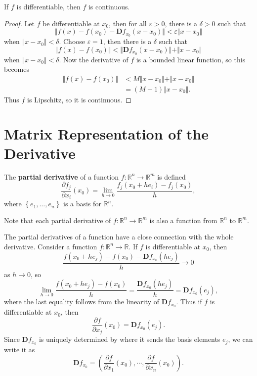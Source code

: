 \documentclass[10pt]{report}
\begin{document}
\begin{prop}
	If $f$ is differentiable, then $f$ is continuous.
\end{prop}
\begin{proof}
	Let $f$ be differentiable at $x_0$, then for all $\varepsilon > 0$, there is a $\delta > 0$ such that
	\[
		\Vert{f(x) - f(x_0) - \mathbf{D}f_{x_0}(x-x_0)}\Vert < \varepsilon \Vert{x-x_0}\Vert
	\] when $\Vert{x-x_0}\Vert< \delta$. Choose $\varepsilon = 1$, then there is a $\delta$ such that
	\[
		\Vert{f(x) - f(x_0)}\Vert < \Vert{\mathbf{D}f_{x_0}(x-x_0)}\Vert+ \Vert{x-x_0}\Vert
	\] when $\Vert{x-x_0}\Vert< \delta$. Now the derivative of $f$ is a bounded linear function, so this becomes
	\begin{align*}
		\Vert{f(x) - f(x_0)}\Vert &< M \Vert{x-x_0}\Vert+ \Vert{x-x_0}\Vert \\
					  &= (M+1) \Vert{x-x_0}\Vert.
	\end{align*}
	Thus $f$ is Lipschitz, so it is continuous.
\end{proof}



\section{Matrix Representation of the Derivative}

\begin{defn}[]
The \textbf{partial derivative} of a function $f:\mathbb{R}^n \to \mathbb{R}^m$ is defined
\[
	\frac{\partial f_j}{\partial x_i} (x_0) = \lim_{h \to 0} \frac{f_j(x_0 + h e_i) - f_j(x_0)}{h},
\] where $\left\{ e_1, \dots, e_n \right\}$ is a basis for $\mathbb{R}^n$.
\end{defn}

Note that each partial derivative of $f: \mathbb{R}^n \to \mathbb{R}^m$ is also a function from $\mathbb{R}^n$ to $\mathbb{R}^m$.

The partial derivatives of a function have a close connection with the whole derivative. Consider a function $f: \mathbb{R}^n \to \mathbb{R}$. If $f$ is differentiable at $x_0$, then
\[
	\frac{f(x_0+he_j) - f(x_0) - \mathbf{D}f_{x_0}(he_j)}{h} \to 0
\] as $h \to 0$, so
\[
	\lim_{h \to 0} \frac{f(x_0+he_j) - f(x_0)}{h} = \frac{\mathbf{D}f_{x_0}(he_j)}{h} = \mathbf{D}f_{x_0}(e_j),
\] where the last equality follows from the linearity of $\mathbf{D}f_{x_0}$. Thus if $f$ is differentiable at $x_0$, then
\[
	\frac{\partial f}{\partial x_j}(x_0) = \mathbf{D}f_{x_0}(e_j).
\] Since $\mathbf{D}f_{x_0}$ is uniquely determined by where it sends the basis elements $e_j$, we can write it as
\[
	\mathbf{D}f_{x_0} = \left( \frac{\partial f}{\partial x_1} (x_0), \cdots, \frac{\partial f}{\partial x_n} (x_0) \right).
\] 
\end{document}
